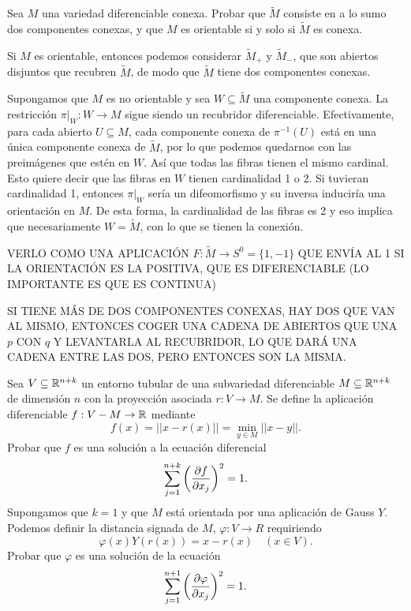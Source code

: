 \documentclass[twoside]{article}
\begin{document}
\begin{ejercicio}{9.16}
Sea $M$ una variedad diferenciable conexa. Probar que $\widetilde{M}$ consiste en a lo sumo dos componentes conexas, y que $M$ es orientable si y solo si $\widetilde{M}$ es conexa.
\end{ejercicio}
\begin{solucion}
Si $M$ es orientable, entonces podemos considerar $\widetilde{M}_+$ y $\widetilde{M}_-$, que son abiertos disjuntos que recubren $\widetilde{M}$, de modo que $\widetilde{M}$ tiene dos componentes conexas.


Supongamos que $M$ es no orientable y sea $W\subseteq\widetilde{M}$ una componente conexa. La restricción $\pi|_W: W\to M$ sigue siendo un recubridor diferenciable. Efectivamente, para cada abierto $U\subseteq M$, cada componente conexa de $\pi^{-1}(U)$ está en una única componente conexa de $\widetilde{M}$, por lo que podemos quedarnos con las preimágenes que estén en $W$. Así que todas las fibras tienen el mismo cardinal. Esto quiere decir que  las fibras en $W$ tienen cardinalidad 1 o 2. Si tuvieran cardinalidad 1, entonces $\pi|_W$ sería un difeomorfismo y su inversa induciría una orientación en $M$. De esta forma, la cardinalidad de las fibras es 2 y eso implica que necesariamente $W=\widetilde{M}$, con lo que se tienen la conexión.

VERLO COMO UNA APLICACIÓN $F:\widetilde{M}\to S^0=\{1,-1\}$ QUE ENVÍA AL 1 SI LA ORIENTACIÓN ES LA POSITIVA, QUE ES DIFERENCIABLE (LO IMPORTANTE ES QUE ES CONTINUA)

SI TIENE MÁS DE DOS COMPONENTES CONEXAS, HAY DOS QUE VAN AL MISMO, ENTONCES COGER UNA CADENA DE ABIERTOS QUE UNA $p$ CON $q$ Y LEVANTARLA AL RECUBRIDOR, LO QUE DARÁ UNA CADENA ENTRE LAS DOS, PERO ENTONCES SON LA MISMA. 
\end{solucion}
\newpage

\begin{ejercicio}{9.17}
Sea $V\subseteq\mathbb{R}^{n+k}$ un entorno tubular de una subvariedad diferenciable $M\subseteq\mathbb{R}^{n+k}$ de dimensión $n$ con la proyección asociada $r:V\to M$. Se define la aplicación diferenciable $f:V-M\to\mathbb{R}$ mediante
\[
f(x)=||x-r(x)||=\min_{y\in M}||x-y||.
\]
Probar que $f$ es una solución a la ecuación diferencial 
\[
\sum_{j=1}^{n+k}\left(\frac{\partial f}{\partial x_j}\right)^2=1.
\]
Supongamos que $k=1$ y que $M$ está orientada por una aplicación de Gauss $Y$. Podemos definir la distancia signada de $M$, $\varphi:V\to R$ requiriendo
\[
\varphi(x)Y(r(x))=x-r(x)\quad (x\in V).
\]
Probar que $\varphi$ es una solución de la ecuación 
\[
\sum_{j=1}^{n+1}\left(\frac{\partial \varphi}{\partial x_j}\right)^2=1.
\]
\end{ejercicio}
\begin{solucion}

\end{solucion}
\newpage
\end{document}
